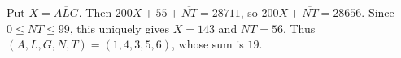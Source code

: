 Put $X=\overline{ALG}$. Then $200X+55+\overline{NT}=28711$, so $200X+\overline{NT}=28656$. Since $0\le\overline{NT}\le99$, this uniquely gives $X=143$ and $\overline{NT}=56$. Thus $(A,L,G,N,T)=(1,4,3,5,6)$, whose sum is $\boxed{19}$.
